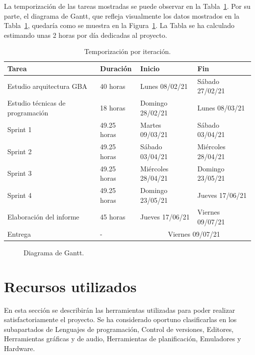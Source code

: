 La temporización de las tareas mostradas se puede observar en la Tabla~\ref{tab:iteraciones}. Por su parte, el diagrama de Gantt, que refleja visualmente los datos mostrados en la Tabla~\ref{tab:iteraciones}, quedaría como se muestra en la Figura~\ref{fig:gantt}. La Tabla se ha calculado estimando unas 2 horas por día dedicadas al proyecto. 

\begin{table}[h]
	\centering
	\begin{tabular}{| l | l | l | l |}
		\hline
		\textbf{Tarea} & \textbf{Duración} & \textbf{Inicio} & \textbf{Fin} \\ \hline
		Estudio arquitectura GBA & 40 horas & Lunes 08/02/21 & Sábado 27/02/21 \\ \hline
		Estudio técnicas de programación & 18 horas & Domingo 28/02/21  & Lunes 08/03/21\\ \hline
		Sprint 1 & 49.25 horas & Martes 09/03/21 & Sábado 03/04/21 \\ \hline
		Sprint 2 & 49.25 horas & Sábado 03/04/21 & Miércoles 28/04/21 \\ \hline
		Sprint 3 & 49.25 horas & Miércoles 28/04/21 & Domingo 23/05/21 \\ \hline
		Sprint 4 & 49.25 horas & Domingo 23/05/21 & Jueves 17/06/21 \\ \hline
		Elaboración del informe & 45 horas & Jueves 17/06/21 & Viernes 09/07/21 \\ \hline
		Entrega & - & \multicolumn{2}{c|}{Viernes 09/07/21} \\ \hline
	\end{tabular}
	\caption{Temporización por iteración.}
	\label{tab:iteraciones}
\end{table}

\begin{figure}[t]
	\centering
	\caption{Diagrama de Gantt.}
	\label{fig:gantt}
\end{figure}
\FloatBarrier{}

\section{Recursos utilizados}
En esta sección se describirán las herramientas utilizadas para poder realizar satisfactoriamente el proyecto. Se ha considerado oportuno clasificarlas en los subapartados de Lenguajes de programación, Control de versiones, Editores, Herramientas gráficas y de audio, Herramientas de planificación, Emuladores y Hardware.

